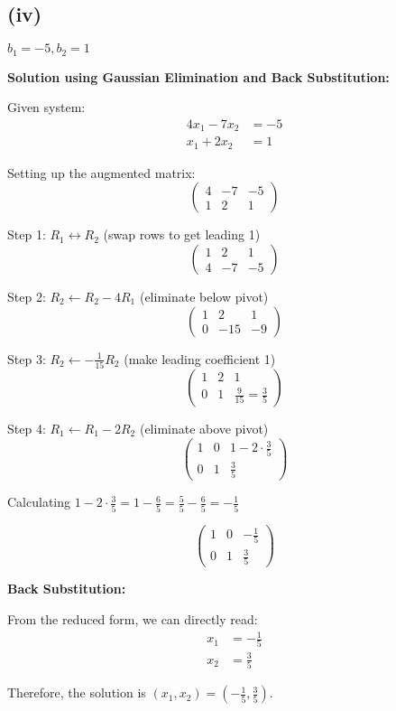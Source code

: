 \subsection*{(iv)} $b_1 = -5, b_2 = 1$

\textbf{Solution using Gaussian Elimination and Back Substitution:}

Given system:
\begin{align}
4x_1 - 7x_2 &= -5\\
x_1 + 2x_2 &= 1
\end{align}

Setting up the augmented matrix:
\[
\left(\begin{array}{cc|c}
4 & -7 & -5\\
1 & 2 & 1
\end{array}\right)
\]

Step 1: $R_1 \leftrightarrow R_2$ (swap rows to get leading 1)
\[
\left(\begin{array}{cc|c}
1 & 2 & 1\\
4 & -7 & -5
\end{array}\right)
\]

Step 2: $R_2 \leftarrow R_2 - 4R_1$ (eliminate below pivot)
\[
\left(\begin{array}{cc|c}
1 & 2 & 1\\
0 & -15 & -9
\end{array}\right)
\]

Step 3: $R_2 \leftarrow -\frac{1}{15}R_2$ (make leading coefficient 1)
\[
\left(\begin{array}{cc|c}
1 & 2 & 1\\
0 & 1 & \frac{9}{15} = \frac{3}{5}
\end{array}\right)
\]

Step 4: $R_1 \leftarrow R_1 - 2R_2$ (eliminate above pivot)
\[
\left(\begin{array}{cc|c}
1 & 0 & 1 - 2 \cdot \frac{3}{5}\\
0 & 1 & \frac{3}{5}
\end{array}\right)
\]

Calculating $1 - 2 \cdot \frac{3}{5} = 1 - \frac{6}{5} = \frac{5}{5} - \frac{6}{5} = -\frac{1}{5}$

\[
\left(\begin{array}{cc|c}
1 & 0 & -\frac{1}{5}\\
0 & 1 & \frac{3}{5}
\end{array}\right)
\]

\textbf{Back Substitution:}

From the reduced form, we can directly read:
\begin{align*}
x_1 &= -\frac{1}{5}\\
x_2 &= \frac{3}{5}
\end{align*}

Therefore, the solution is $\boxed{\left(x_1, x_2\right) = \left(-\frac{1}{5}, \frac{3}{5}\right)}$.